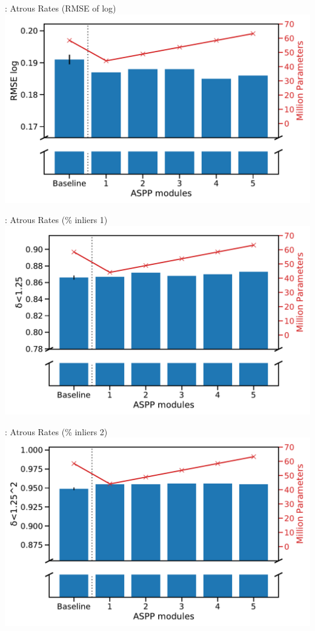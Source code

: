 \begin{frame}[c]{\subsecname: Atrous Rates (RMSE of log)}
  \centering
  \includegraphics[width=1.0\textwidth]{figures/results/experiment2_RMSE log.pdf}
\end{frame}

\begin{frame}[c]{\subsecname: Atrous Rates (\% inliers 1)}
  \centering
  \includegraphics[width=1.0\textwidth]{figures/results/experiment2_d-125.pdf}
\end{frame}

\begin{frame}[c]{\subsecname: Atrous Rates (\% inliers 2)}
  \centering
  \includegraphics[width=1.0\textwidth]{figures/results/experiment2_d-125^2.pdf}
\end{frame}

